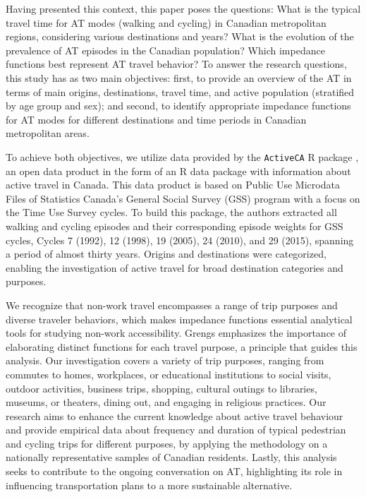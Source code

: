 \documentclass[preprint, 3p,
authoryear]{elsarticle} %
\begin{document}
Having presented this context, this paper poses the questions: What is
the typical travel time for AT modes (walking and cycling) in Canadian
metropolitan regions, considering various destinations and years? What
is the evolution of the prevalence of AT episodes in the Canadian
population? Which impedance functions best represent AT travel behavior?
To answer the research questions, this study has as two main objectives:
first, to provide an overview of the AT in terms of main origins,
destinations, travel time, and active population (stratified by age
group and sex); and second, to identify appropriate impedance functions
for AT modes for different destinations and time periods in Canadian
metropolitan areas.

To achieve both objectives, we utilize data provided by the
\texttt{ActiveCA} R package \citep{dossantos2024ActiveCA}, an open data
product in the form of an R data package with information about active
travel in Canada. This data product is based on Public Use Microdata
Files of Statistics Canada's General Social Survey (GSS) program with a
focus on the Time Use Survey cycles. To build this package, the authors
extracted all walking and cycling episodes and their corresponding
episode weights for GSS cycles, Cycles 7 (1992), 12 (1998), 19 (2005),
24 (2010), and 29 (2015), spanning a period of almost thirty years.
Origins and destinations were categorized, enabling the investigation of
active travel for broad destination categories and purposes.

We recognize that non-work travel encompasses a range of trip purposes
and diverse traveler behaviors, which makes impedance functions
essential analytical tools for studying non-work accessibility. Grengs
\citeyearpar{grengs2015nonwork} emphasizes the importance of elaborating
distinct functions for each travel purpose, a principle that guides this
analysis. Our investigation covers a variety of trip purposes, ranging
from commutes to homes, workplaces, or educational institutions to
social visits, outdoor activities, business trips, shopping, cultural
outings to libraries, museums, or theaters, dining out, and engaging in
religious practices. Our research aims to enhance the current knowledge
about active travel behaviour and provide empirical data about frequency
and duration of typical pedestrian and cycling trips for different
purposes, by applying the methodology on a nationally representative
samples of Canadian residents. Lastly, this analysis seeks to contribute
to the ongoing conversation on AT, highlighting its role in influencing
transportation plans to a more sustainable alternative.
\end{document}
